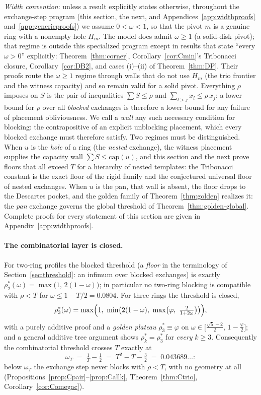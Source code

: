 \documentclass[11pt]{article}
\theoremstyle{definition}
\begin{document}
\emph{Width convention}: unless a result explicitly states otherwise,
throughout the exchange-step program (this section, the next, and
Appendices~\ref{app:widthproofs} and~\ref{app:genericproofs}) we assume
$0<\omega<1$, so that the pivot $m$ is a genuine ring with a nonempty
hole $H_m$. The model does admit $\omega\ge1$ (a solid-disk pivot); that
regime is outside this specialized program except in results that state ``every $\omega>0$''
explicitly: Theorem~\ref{thm:corner}, Corollary~\ref{cor:Cmin}'s
Tribonacci closure, Corollary~\ref{cor:DB2}, and cases (i)--(ii) of
Theorem~\ref{thm:DP}. Their proofs route the $\omega\ge1$ regime
through walls that do not use $H_m$ (the trio frontier and the witness
capacity) and so remain valid for a solid pivot. Everything $\rho$
imposes on $S$ is the pair of inequalities $\sum S\le\rho$ and
$\sum_{l>j}x_l\le\rho\,x_j$; a lower bound for $\rho$ over all
\emph{blocked} exchanges is therefore a lower bound for any failure of
placement obliviousness. We call a \emph{wall} any such necessary
condition for blocking: the contrapositive of an explicit unblocking
placement, which every blocked exchange must therefore satisfy. Two
regimes must be distinguished. When $u$ is
the \emph{hole} of a ring (the \emph{nested} exchange), the witness
placement supplies the capacity wall $\sum S\le\mathrm{cap}(u)$, and this
section and the next prove floors that all exceed $T$ for a hierarchy of
nested templates: the Tribonacci constant is the exact floor of the
rigid family and the conjectured universal floor of nested exchanges.
When $u$ is the pan, that wall is absent, the floor drops to the Descartes pocket, and
the golden family of Theorem~\ref{thm:golden} realizes it: the
\emph{pan} exchange governs the global threshold of
Theorem~\ref{thm:golden-global}. Complete proofs for every statement of this
section are given in Appendix~\ref{app:widthproofs}.

\paragraph{The combinatorial layer is closed.}
For two-ring profiles the blocked threshold (a \emph{floor} in the
terminology of Section~\ref{sec:threshold}: an infimum over blocked
exchanges) is exactly
$\rho^*_2(\omega)=\max\bigl(1,\,2(1-\omega)\bigr)$; in particular no
two-ring blocking is compatible with $\rho<T$ for
$\omega\le1-T/2=0.0804$. For three rings the threshold is closed,
\[
\rho^*_3(\omega)=\max\Bigl(1,\ \min\bigl(2(1-\omega),\
\max\bigl(\varphi,\ \tfrac{2}{1+2\omega}\bigr)\bigr)\Bigr),
\]
with a purely additive proof and a \emph{golden plateau}
$\rho^*_3\equiv\varphi$ on
$\omega\in\bigl[\tfrac{\sqrt5-2}{2},\,1-\tfrac{\varphi}{2}\bigr]$; and a
general additive tree argument shows $\rho^*_k=\rho^*_3$ for \emph{every}
$k\ge3$. Consequently the combinatorial threshold crosses $T$ exactly at
\[
\omega_T \;=\; \tfrac1T-\tfrac12 \;=\; T^2-T-\tfrac32 \;=\;0.043689\dots :
\]
below $\omega_T$ the exchange step never blocks with $\rho<T$, with no
geometry at all
(Propositions~\ref{prop:Cpair}--\ref{prop:Callk},
Theorem~\ref{thm:Ctrio}, Corollary~\ref{cor:Comegac}).
\end{document}
